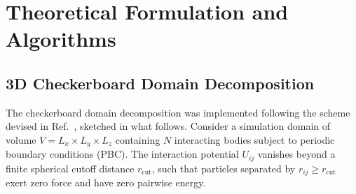 \documentclass[final,5p,times,twocolumn]{elsarticle}
\begin{document}
\section{Theoretical Formulation and Algorithms}
\label{sec:algorithms}

\subsection{3D Checkerboard Domain Decomposition}
\label{sec:algo_cb}

 The checkerboard domain decomposition was implemented  following the
 scheme devised in Ref.~\cite{anderson2013checkerboard}, sketched in
 what follows. 
Consider a simulation domain of volume $V = L_x \times L_y \times L_z$
containing $N$ interacting bodies subject to periodic boundary
conditions (PBC). The interaction potential $U_{ij}$ vanishes beyond a
finite spherical cutoff distance $r_{\text{cut}}$, such that particles
separated by $r_{ij} \ge r_{\text{cut}}$ exert zero force and have
zero pairwise energy. 
\end{document}
